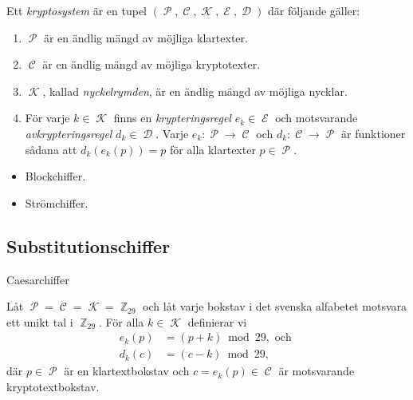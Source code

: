 \documentclass{beamer}
\theoremstyle{definition}
\DeclareMathOperator{\p}{\mathcal{P}}
\let\P\p
\DeclareMathOperator{\C}{\mathcal{C}}
\DeclareMathOperator{\K}{\mathcal{K}}
\DeclareMathOperator{\E}{\mathcal{E}}
\DeclareMathOperator{\D}{\mathcal{D}}
\DeclareMathOperator{\Z}{\mathbb{Z}}
\let\stoch\mathbf
\renewcommand{\p}{\stoch P}
\begin{document}
\begin{frame}{\insertsubsectionhead}
  \begin{definition}\label{def:kryptosystem}
    Ett \emph{kryptosystem} är en tupel \((\P, \C, \K, \E, \D)\) där följande 
    gäller:
    \begin{enumerate}
      \item \(\P\) är en ändlig mängd av möjliga klartexter.
      \item \(\C\) är en ändlig mängd av möjliga kryptotexter.
      \item \(\K\), kallad \emph{nyckelrymden}, är en ändlig mängd av möjliga 
        nycklar.
      \item För varje \(k\in \K\) finns en \emph{krypteringsregel} \(e_k\in 
        \E\) och motsvarande \emph{avkrypteringsregel} \(d_k\in \D\).
        Varje \(e_k\colon \P\to \C\) och \(d_k\colon \C\to \P\) är funktioner 
        sådana att \(d_k(e_k(p)) = p\) för alla klartexter \(p\in \P\).
    \end{enumerate}
  \end{definition}
\end{frame}

\begin{frame}{\insertsubsectionhead}
  \begin{itemize}
    \item Blockchiffer.
    \item Strömchiffer.
  \end{itemize}
\end{frame}

\subsection{Substitutionschiffer}

\begin{frame}{\insertsubsectionhead}{Caesarchiffer}
  \begin{definition}[Skiftchiffer]\label{def:shiftCipher}
    Låt \(\P = \C = \K = \Z_{29}\) och låt varje bokstav i det svenska 
    alfabetet motsvara ett unikt tal i \(\Z_{29}\).
    För alla \(k\in \K\) definierar vi
    \begin{align}
      \nonumber
      e_k(p) &= (p + k) \bmod 29, \text{ och } \\
      \nonumber
      d_k(c) &= (c - k) \bmod 29,
    \end{align}
    där \(p\in \P\) är en klartextbokstav och \(c = e_k(p)\in \C\) är 
    motsvarande kryptotextbokstav.
  \end{definition}
\end{frame}
\end{document}
